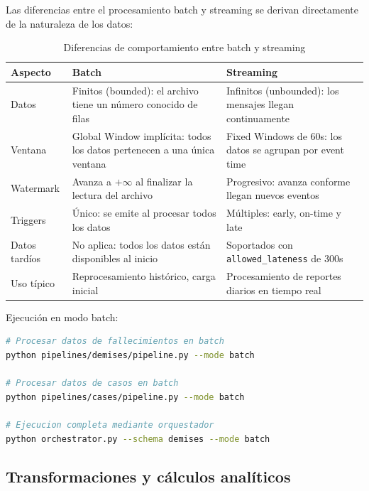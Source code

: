 \documentclass[12pt,a4paper]{article}
\begin{document}
Las diferencias entre el procesamiento batch y streaming se derivan directamente de la naturaleza de los datos:

\begin{table}[H]
    \centering
    \caption{Diferencias de comportamiento entre batch y streaming}
    \begin{tabular}{@{}lp{6cm}p{6cm}@{}}
        \toprule
        \textbf{Aspecto} & \textbf{Batch}                                                          & \textbf{Streaming}                                        \\
        \midrule
        Datos            & Finitos (bounded): el archivo tiene un número conocido de filas         & Infinitos (unbounded): los mensajes llegan continuamente  \\
        Ventana          & Global Window implícita: todos los datos pertenecen a una única ventana & Fixed Windows de 60s: los datos se agrupan por event time \\
        Watermark        & Avanza a $+\infty$ al finalizar la lectura del archivo                  & Progresivo: avanza conforme llegan nuevos eventos         \\
        Triggers         & Único: se emite al procesar todos los datos                             & Múltiples: early, on-time y late                          \\
        Datos tardíos    & No aplica: todos los datos están disponibles al inicio                  & Soportados con \texttt{allowed\_lateness} de 300s         \\
        Uso típico       & Reprocesamiento histórico, carga inicial                                & Procesamiento de reportes diarios en tiempo real          \\
        \bottomrule
    \end{tabular}
\end{table}

Ejecución en modo batch:
\begin{lstlisting}[language=bash, caption=Comandos para ejecución en modo batch]
# Procesar datos de fallecimientos en batch
python pipelines/demises/pipeline.py --mode batch

# Procesar datos de casos en batch
python pipelines/cases/pipeline.py --mode batch

# Ejecucion completa mediante orquestador
python orchestrator.py --schema demises --mode batch
\end{lstlisting}

\subsection{Transformaciones y cálculos analíticos}\label{transformaciones-y-cuxe1lculos-analuxedticos}
\end{document}
